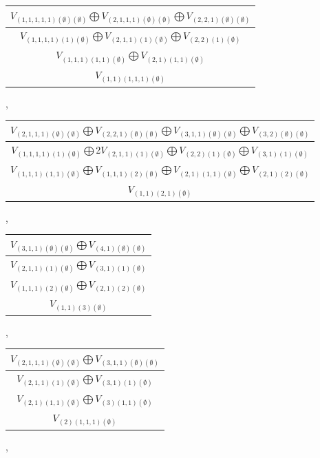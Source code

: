 \documentclass[letterpaper,11pt]{article}
\begin{document}
	\begin{tabular}{| c |}
		\hline
		$V_{(1,1,1,1,1)(\emptyset)(\emptyset)}$$\bigoplus$$V_{(2,1,1,1)(\emptyset)(\emptyset)}$$\bigoplus$$V_{(2,2,1)(\emptyset)(\emptyset)}$\\
		\hline
		$V_{(1,1,1,1)(1)(\emptyset)}$$\bigoplus$$V_{(2,1,1)(1)(\emptyset)}$$\bigoplus$$V_{(2,2)(1)(\emptyset)}$\\
		\hline
		$V_{(1,1,1)(1,1)(\emptyset)}$$\bigoplus$$V_{(2,1)(1,1)(\emptyset)}$\\
		\hline
		$V_{(1,1)(1,1,1)(\emptyset)}$\\
		\hline
	\end{tabular}, 
	\newline 
	\begin{tabular}{| c |}
		\hline
		$V_{(2,1,1,1)(\emptyset)(\emptyset)}$$\bigoplus$$V_{(2,2,1)(\emptyset)(\emptyset)}$$\bigoplus$$V_{(3,1,1)(\emptyset)(\emptyset)}$$\bigoplus$$V_{(3,2)(\emptyset)(\emptyset)}$\\
		\hline
		$V_{(1,1,1,1)(1)(\emptyset)}$$\bigoplus$2$V_{(2,1,1)(1)(\emptyset)}$$\bigoplus$$V_{(2,2)(1)(\emptyset)}$$\bigoplus$$V_{(3,1)(1)(\emptyset)}$\\
		\hline
		$V_{(1,1,1)(1,1)(\emptyset)}$$\bigoplus$$V_{(1,1,1)(2)(\emptyset)}$$\bigoplus$$V_{(2,1)(1,1)(\emptyset)}$$\bigoplus$$V_{(2,1)(2)(\emptyset)}$\\
		\hline
		$V_{(1,1)(2,1)(\emptyset)}$\\
		\hline
	\end{tabular}, 
	\begin{tabular}{| c |}
		\hline
		$V_{(3,1,1)(\emptyset)(\emptyset)}$$\bigoplus$$V_{(4,1)(\emptyset)(\emptyset)}$\\
		\hline
		$V_{(2,1,1)(1)(\emptyset)}$$\bigoplus$$V_{(3,1)(1)(\emptyset)}$\\
		\hline
		$V_{(1,1,1)(2)(\emptyset)}$$\bigoplus$$V_{(2,1)(2)(\emptyset)}$\\
		\hline
		$V_{(1,1)(3)(\emptyset)}$\\
		\hline
	\end{tabular}, 
	\newline
	\begin{tabular}{| c |}
		\hline
		$V_{(2,1,1,1)(\emptyset)(\emptyset)}$$\bigoplus$$V_{(3,1,1)(\emptyset)(\emptyset)}$\\
		\hline
		$V_{(2,1,1)(1)(\emptyset)}$$\bigoplus$$V_{(3,1)(1)(\emptyset)}$\\
		\hline
		$V_{(2,1)(1,1)(\emptyset)}$$\bigoplus$$V_{(3)(1,1)(\emptyset)}$\\
		\hline
		$V_{(2)(1,1,1)(\emptyset)}$\\
		\hline
	\end{tabular}, 
\end{document}
